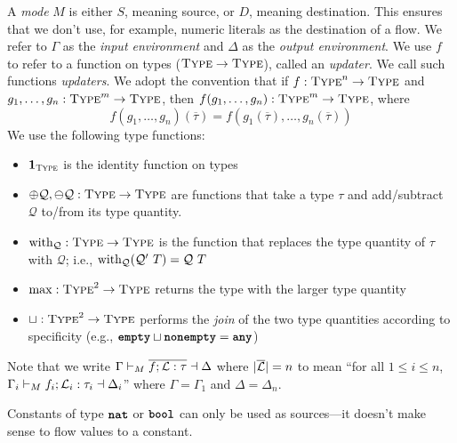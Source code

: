 \documentclass[nonacm, dvipsnames, sigconf]{acmart}
\begin{document}
A \emph{mode} $M$ is either $S$, meaning source, or $D$, meaning destination.
This ensures that we don't use, for example, numeric literals as the destination of a flow.
We refer to $\Gamma$ as the \emph{input environment} and $\Delta$ as the \emph{output environment}.
We use $f$ to refer to a function on types ($\types \to \types$), called an \emph{updater}.
We call such functions \emph{updaters}.
We adopt the convention that if $f : \types^n \to \types$ and $g_1,\ldots,g_n : \types^m \to \types$, then $f(g_1, \ldots, g_n) : \types^m \to \types$, where
\[
    f(g_1, \ldots, g_n)(\overline{\tau}) = f(g_1(\overline{\tau}), \ldots, g_n(\overline{\tau}))
\]
We use the following type functions:
\begin{itemize}
    \item $\id{\types}$ is the identity function on types
    \item $\oplus \mathcal{Q}, \ominus \mathcal{Q} : \types \to \types$ are functions that take a type $\tau$ and add/subtract $\mathcal{Q}$ to/from its type quantity.
    \item $\with_{\mathcal{Q}} : \types \to \types$ is the function that replaces the type quantity of $\tau$ with $\mathcal{Q}$; i.e., $\with_{\mathcal{Q}}(\mathcal{Q}'~T) = \mathcal{Q}~T$
    \item $\max : \types^2 \to \types$ returns the type with the larger type quantity
    \item $\sqcup : \types^2 \to \types$ performs the \emph{join} of the two type quantities according to specificity (e.g., $\emptyq \sqcup \nonempty = \any$)
\end{itemize}

Note that we write $\Gamma \flowproves_M \overline{f ; \Loc : \tau} \flowprovesout \Delta$ where $|\overline{\Loc}| = n$ to mean
``for all $1 \leq i \leq n$, $\Gamma_i \flowproves_M f_i ; \Loc_i : \tau_i \flowprovesout \Delta_i$'' where $\Gamma = \Gamma_1$ and $\Delta = \Delta_n$.

Constants of type $\natt$ or $\boolt$ can only be used as sources---it doesn't make sense to flow values to a constant.
\begin{mathpar}

\end{mathpar}
\end{document}
